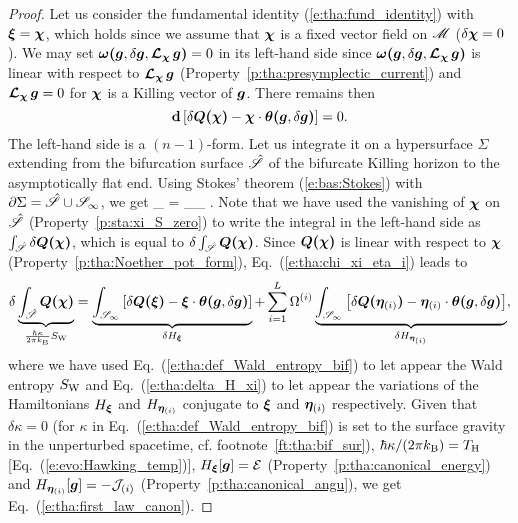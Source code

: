 \begin{proof}
Let us consider the fundamental identity (\ref{e:tha:fund_identity}) with $\bm{\xi} = \bm{\chi}$,
which holds since we assume that $\bm{\chi}$ is a fixed vector field on $\mathscr{M}$
($\delta\bm{\chi}=0$).
We may set $\bm{\omega}\textbf{(}\bm{g},\delta\bm{g}, \bm{\mathcal{L}}_{\bm{\chi}}\,\bm{g}\textbf{)} = 0$ in
its left-hand side since $\bm{\omega}\textbf{(}\bm{g},\delta\bm{g}, \bm{\mathcal{L}}_{\bm{\chi}}\,\bm{g}\textbf{)}$
is linear with respect to $\bm{\mathcal{L}}_{\bm{\chi}}\,\bm{g}$ (Property~\ref{p:tha:presymplectic_current})
and $\bm{\mathcal{L}}_{\bm{\chi}}\,\bm{g} = 0$ for $\bm{\chi}$ is a Killing vector of $\bm{g}$.
There remains then
\[
    \mathbf{d} \left[ \delta\bm{Q}\textbf{(}\bm{\chi}\textbf{)}
    - \bm{\chi}\cdot\bm{\theta}\textbf{(}\bm{g},\delta\bm{g}\textbf{)} \right] = 0 .
\]
The left-hand side is a $(n-1)$-form. Let us integrate it on a hypersurface $\Sigma$
extending from the bifurcation surface $\hat{\mathscr{S}}$ of the bifurcate
Killing horizon to the asymptotically flat end. Using
Stokes' theorem (\ref{e:bas:Stokes}) with $\partial\Sigma = \hat{\mathscr{S}} \cup \mathscr{S}_\infty$,
we get
\be \label{e:tha:delta_int_Q_bif}
    \delta \int_{\hat{\Sp}} \lld\w{\chi}\rld
    = \int_{\Sp_\infty}  .
\ee
Note that we have used the vanishing of $\bm{\chi}$ on $\hat{\mathscr{S}}$ (Property~\ref{p:sta:xi_S_zero})
to write the integral in the left-hand side as
$\int_{\hat{\mathscr{S}}} \delta\bm{Q}\textbf{(}\bm{\chi}\textbf{)}$,
which is equal to
$\delta \int_{\hat{\mathscr{S}}}\bm{Q}\textbf{(}\bm{\chi}\textbf{)}$. Since $\bm{Q}\textbf{(}\bm{\chi}\textbf{)}$
is linear with respect to $\bm{\chi}$ (Property~\ref{p:tha:Noether_pot_form}),
Eq.~(\ref{e:tha:chi_xi_eta_i}) leads to
\[
    \delta \underbrace{\int_{\hat{\mathscr{S}}}
    \bm{Q}\textbf{(}\bm{\chi}\textbf{)}}_{\frac{\hbar \kappa}{2\pi k_{\rm B}} S_{\rm W}} =
    \underbrace{\int_{\mathscr{S}_\infty} \left[ \delta\bm{Q}\textbf{(}\bm{\xi}\textbf{)}
    - \bm{\xi}\cdot\bm{\theta}\textbf{(}\bm{g},\delta\bm{g}\textbf{)} \right]}_{\delta H_{\bm{\xi}}}
    + \sum_{i=1}^{L} \Omega^{(i)}
    \underbrace{\int_{\mathscr{S}_\infty} \left[ \delta\bm{Q}\textbf{(}\bm{\eta}_{(i)}\textbf{)}
    - \bm{\eta}_{(i)}\cdot\bm{\theta}\textbf{(}\bm{g},\delta\bm{g}\textbf{)} \right]}_{\delta H_{\bm{\eta}_{(i)}}} ,
\]
where we have used Eq.~(\ref{e:tha:def_Wald_entropy_bif}) to let appear
the Wald entropy $S_{\rm W}$ and
Eq.~(\ref{e:tha:delta_H_xi}) to let appear the
variations of the Hamiltonians $H_{\bm{\xi}}$ and $H_{\bm{\eta}_{(i)}}$ conjugate
to $\bm{\xi}$ and $\bm{\eta}_{(i)}$ respectively. Given that
$\delta\kappa = 0$ (for $\kappa$ in Eq.~(\ref{e:tha:def_Wald_entropy_bif})
is set to the surface gravity in the unperturbed spacetime, cf. footnote~\ref{ft:tha:bif_sur}),
$\hbar \kappa/(2\pi k_{\rm B}) = T_{\rm H}$ [Eq.~(\ref{e:evo:Hawking_temp})],
$H_{\bm{\xi}}[\bm{g}] = \mathcal{E}$ (Property~\ref{p:tha:canonical_energy})
and $H_{\bm{\eta}_{(i)}}[\bm{g}] = - \mathcal{J}_{(i)}$ (Property~\ref{p:tha:canonical_angu}),
we get Eq.~(\ref{e:tha:first_law_canon}).
\end{proof}

